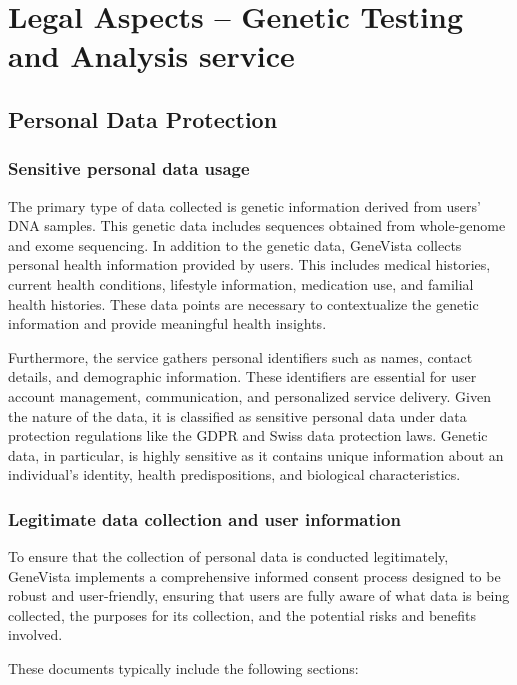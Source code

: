 \documentclass[a4paper]{article}
\begin{document}
\pagebreak

\section{Legal Aspects -- Genetic Testing and Analysis service}

\subsection{Personal Data Protection}

\subsubsection{Sensitive personal data usage}

The primary type of data collected is genetic information derived from users' DNA samples. This genetic data includes sequences obtained from whole-genome and exome sequencing. In addition to the genetic data, GeneVista collects personal health information provided by users. This includes medical histories, current health conditions, lifestyle information, medication use, and familial health histories. These data points are necessary to contextualize the genetic information and provide meaningful health insights.

Furthermore, the service gathers personal identifiers such as names, contact details, and demographic information. These identifiers are essential for user account management, communication, and personalized service delivery. Given the nature of the data, it is classified as sensitive personal data under data protection regulations like the GDPR and Swiss data protection laws. Genetic data, in particular, is highly sensitive as it contains unique information about an individual’s identity, health predispositions, and biological characteristics.

\subsubsection{Legitimate data collection and user information}

To ensure that the collection of personal data is conducted legitimately, GeneVista implements a comprehensive informed consent process designed to be robust and user-friendly, ensuring that users are fully aware of what data is being collected, the purposes for its collection, and the potential risks and benefits involved.

These documents typically include the following sections:
\end{document}
